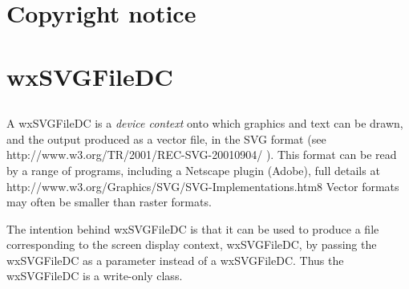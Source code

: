 %
%
\newcommand{\commandref}[2]{\helpref{{\tt $\backslash$#1}}{#2}}%
\newcommand{\commandrefn}[2]{\helprefn{{\tt $\backslash$#1}}{#2}\index{#1}}%
\newcommand{\commandpageref}[2]{\latexignore{\helprefn{{\tt $\backslash$#1}}{#2}}\latexonly{{\tt $\backslash$#1} {\it page \pageref{#2}}}\index{#1}}%
\newcommand{\indexit}[1]{#1\index{#1}}%
\newcommand{\inioption}[1]{{\bf {\tt #1}}\index{#1}}%
\parskip=10pt%
\parindent=0pt%
%
%
\makeindex%
%
\maketitle%
\pagestyle{fancyplain}%
%
%
%
\setfooter{\thepage}{}{}{}{}{\thepage}%
\tableofcontents%

\chapter*{Copyright notice}%
%
\setfooter{\thepage}{}{}{}{}{\thepage}%

\chapter*{wxSVGFileDC}%
%
\setfooter{\thepage}{}{}{}{}{\thepage}%
\section{}\label{wxSVGFileDC}

A wxSVGFileDC is a {\it device context} onto which graphics and text can be drawn, and the output
produced as a vector file, in the SVG format (see http://www.w3.org/TR/2001/REC-SVG-20010904/ ).
This format can be read by a range of programs, including a Netscape plugin (Adobe), full details at 
http://www.w3.org/Graphics/SVG/SVG-Implementations.htm8 Vector formats may often be smaller 
than raster formats.

The intention behind wxSVGFileDC is that it can be used to produce a file corresponding 
to the screen display context, wxSVGFileDC, by passing the wxSVGFileDC as a parameter instead of a wxSVGFileDC. Thus
the wxSVGFileDC is a write-only class.

